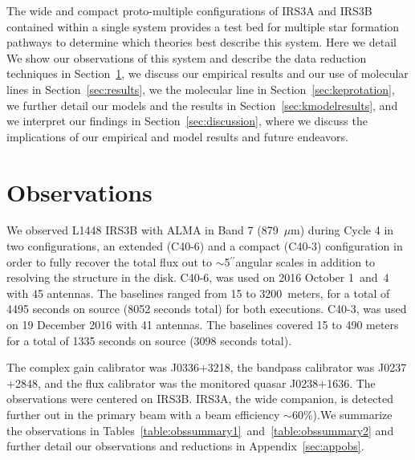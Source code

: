 \documentclass[twocolumn, 12pt]{aastex63}
\renewcommand{\arcsec}{$^{\prime\prime}$}
\renewcommand{\micron}{$\mu$m}
\newcommand{\ab}{$\sim$}
\begin{document}
The wide and compact proto-multiple configurations of IRS3A and IRS3B contained within a single system provides a test bed for multiple star formation pathways to determine which theories best describe this system. Here we detail  We show our observations of this system and describe the data reduction techniques in Section~\ref{sec:obs}, we discuss our empirical results and our use of molecular lines in Section~\ref{sec:results}, we  the molecular line  in Section~\ref{sec:keprotation}, we further detail our models and the results in Section~\ref{sec:kmodelresults}, and we interpret our findings in Section~\ref{sec:discussion}, where we discuss the implications of our empirical and model results and future endeavors. 

\section{Observations}\label{sec:obs}
We observed L1448 IRS3B with ALMA in Band 7 (879~\micron) during Cycle 4 in two configurations, an extended (C40-6) and a compact (C40-3) configuration in order to fully recover the total flux out to \ab5\arcsec\space angular scales in addition to resolving the structure in the disk. C40-6, was used on 2016 October 1~and~4 with 45 antennas. The baselines ranged from 15 to 3200~meters, for a total of 4495 seconds on source (8052 seconds total) for both executions. C40-3, was used on 19 December 2016 with 41 antennas. The baselines covered 15 to 490 meters for a total of 1335 seconds on source (3098 seconds total).

The complex gain calibrator was J0336$+$3218, the bandpass calibrator was J0237$+$2848, and the flux calibrator was the monitored quasar J0238$+$1636. The observations were centered on IRS3B. IRS3A, the wide companion, is detected further out in the primary beam with a beam efficiency \ab60\%).We summarize the observations in Tables~\ref{table:obssummary1}~and~\ref{table:obssummary2} and further detail our observations and reductions in Appendix~\ref{sec:appobs}.
\end{document}
